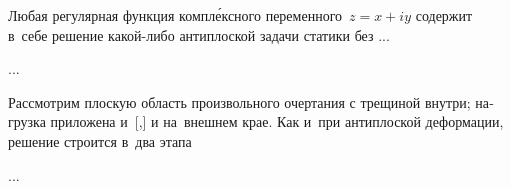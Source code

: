 

\label{section:cracks.antiplanedeformation}

\begin{otherlanguage}{russian}

Любая регулярная функция компл\'{е}ксного переменного~${z = x + iy}$ содержит в~себе решение какой\hbox{-}либо антиплоской задачи статики без ...

...



\end{otherlanguage}



\begin{otherlanguage}{russian}

Рассмотрим плоскую область произвольного очертания с трещиной внутри; нагрузка приложена и~[,] и на~внешнем крае.
Как и~при антиплоской деформации, решение строится в~два этапа

...



\end{otherlanguage}



